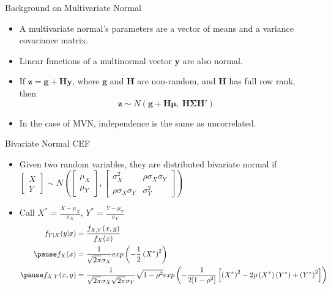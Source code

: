 \documentclass[aspectratio=169, handout, t]{beamer}
\numberwithin{equation}{section}
\begin{document}
\begin{frame}{Background on Multivariate Normal}
\begin{itemize}
\item A multivariate normal's parameters are a vector of means and a variance covariance matrix.
\item  Linear functions of a multinormal vector $\bm{y}$ are also normal.\\
\item If $\bm{z}=\bm{g}+\bm{H}\bm{y}$, where $\bm{g}$ and $\bm{H}$ are non-random, and $\bm{H}$ has full row rank, then 
$$\bm{z}\sim N(\bm{g}+\bm{H\mu},\ \bm{H\Sigma H'})$$
\item In the case of MVN, independence is the same as uncorrelated.
\end{itemize}
\end{frame}

\begin{frame}{Bivariate Normal CEF}
\begin{itemize}
\item Given two random variables, they are distributed bivariate normal if $\begin{bmatrix} X\\Y \end{bmatrix} \sim N\left( \begin{bmatrix} \mu_X\\\mu_Y \end{bmatrix},  \begin{bmatrix} \sigma^2_X & \rho \sigma_X \sigma_Y \\ \rho\sigma_X\sigma_Y & \sigma_Y^2\end{bmatrix}\right)$
\item Call $X^*=\frac{X-\mu_X}{\sigma_X}$, $Y^*=\frac{Y-\mu_Y}{\sigma_Y}$ \pause
\begin{align*}
f_{Y|X}(y|x)&=\frac{f_{X,Y}(x,y)}{f_X(x)}\\\pause
f_X(x)&=\frac{1}{\sqrt{2\pi}\sigma_X} exp\left(-\frac{1}{2}\left(X^*\right)^2\right)\\\pause
f_{X,Y}(x,y)&=\frac{1}{\sqrt{2\pi}\sigma_X\sqrt{2\pi}\sigma_Y}\sqrt{1-\rho^2}  exp\left( -\frac{1}{2[1-\rho^2]}\left[ \left( X^* \right)^2-2\rho \left( X^* \right) \left(  Y^* \right)+ \left( Y^* \right)^2\right]\right)
\end{align*}
\end{itemize}
\end{frame}
\end{document}
